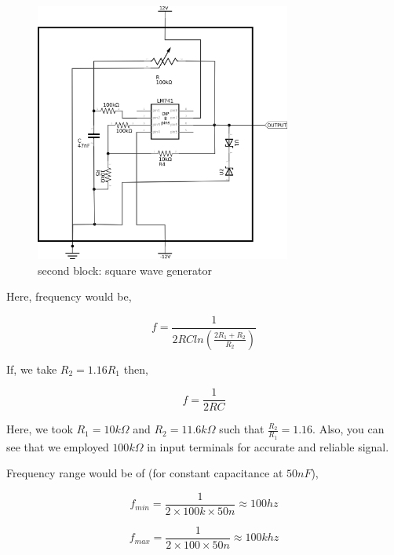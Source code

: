 \documentclass[14pt,a4paper]{extarticle}
\begin{document}
\begin{figure}[H]
    \centering
    \label{squarereal}
    \includegraphics[width=0.75\textwidth]{imgs/squarereal.png}
    \caption{second block: square wave generator}
\end{figure}


Here, frequency would be, 

\begin{equation}
\label{eq:org6e99115}
  f =\frac{1}{2 RC ln(\frac{2R_{1}+R_{2}}{R_{2}})}
\end{equation}

If, we take \(R_{2}=1.16R_{1}\) then, 

\begin{equation}
\label{eq:org850789a}
  f =\frac{1}{2RC}
\end{equation}


Here, we took \(R_{1} = 10k\Omega\) and \(R_{2} = 11.6k\Omega\) such that \(\frac{R_{2}}{R_{1}}=1.16\). Also, you can see that we employed \(100k\Omega\) in input terminals for accurate and reliable signal.

Frequency range would be of (for constant capacitance at \(50nF\)),

\begin{equation*}
\label{eq:orgc58d777}
  f_{min} =\frac{1}{2\times 100k\times 50n} \approx 100 hz
\end{equation*}

\begin{equation*}
\label{eq:orgfae27d0}
  f_{max} =\frac{1}{2\times 100 \times 50n} \approx 100 khz
\end{equation*}
\end{document}
